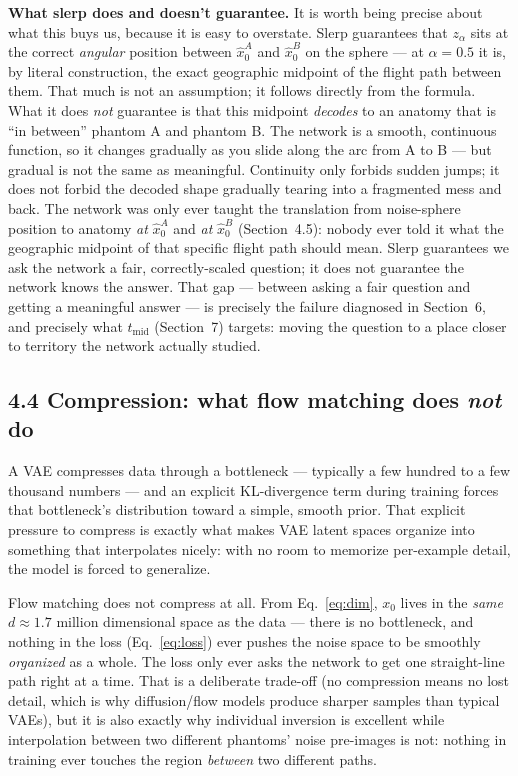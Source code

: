 \documentclass[11pt]{article}
\newcommand{\hsub}[1]{\subsection*{#1}}
\begin{document}
\textbf{What slerp does and doesn't guarantee.} It is worth being precise about what this
buys us, because it is easy to overstate. Slerp guarantees that $z_\alpha$ sits at the correct
\emph{angular} position between $\hat x_0^A$ and $\hat x_0^B$ on the sphere --- at $\alpha=0.5$
it is, by literal construction, the exact geographic midpoint of the flight path between them.
That much is not an assumption; it follows directly from the formula. What it does \emph{not}
guarantee is that this midpoint \emph{decodes} to an anatomy that is ``in between'' phantom A
and phantom B. The network is a smooth, continuous function, so it changes gradually as you
slide along the arc from A to B --- but gradual is not the same as meaningful. Continuity only
forbids sudden jumps; it does not forbid the decoded shape gradually tearing into a fragmented
mess and back. The network was only ever taught the translation from noise-sphere position to
anatomy \emph{at} $\hat x_0^A$ and \emph{at} $\hat x_0^B$ (Section~4.5): nobody ever told it
what the geographic midpoint of that specific flight path should mean. Slerp guarantees we ask
the network a fair, correctly-scaled question; it does not guarantee the network knows the
answer. That gap --- between asking a fair question and getting a meaningful answer --- is
precisely the failure diagnosed in Section~6, and precisely what $t_{\text{mid}}$ (Section~7)
targets: moving the question to a place closer to territory the network actually studied.

\hsub{4.4 Compression: what flow matching does \emph{not} do}
A VAE compresses data through a bottleneck --- typically a few hundred to a few thousand
numbers --- and an explicit KL-divergence term during training forces that bottleneck's
distribution toward a simple, smooth prior. That explicit pressure to compress is exactly what
makes VAE latent spaces organize into something that interpolates nicely: with no room to
memorize per-example detail, the model is forced to generalize.

Flow matching does not compress at all. From Eq.~\eqref{eq:dim}, $x_0$ lives in the
\emph{same} $d\approx 1.7$ million dimensional space as the data --- there is no bottleneck,
and nothing in the loss (Eq.~\eqref{eq:loss}) ever pushes the noise space to be smoothly
\emph{organized} as a whole. The loss only ever asks the network to get one straight-line path
right at a time. That is a deliberate trade-off (no compression means no lost detail, which is
why diffusion/flow models produce sharper samples than typical VAEs), but it is also exactly
why individual inversion is excellent while interpolation between two different phantoms'
noise pre-images is not: nothing in training ever touches the region \emph{between} two
different paths.
\end{document}
